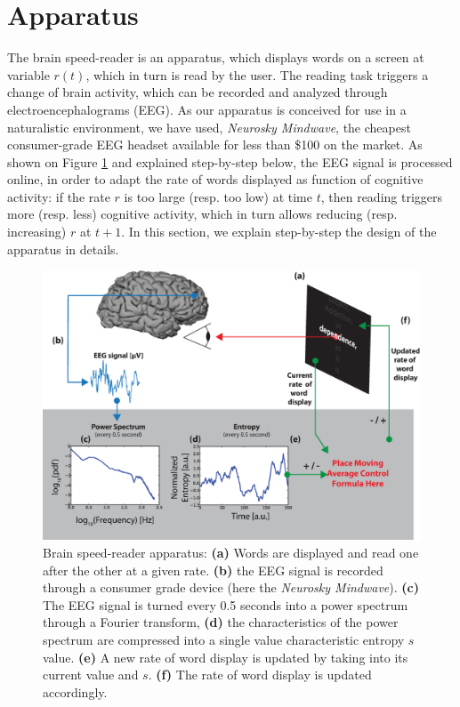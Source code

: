 \section{Apparatus}
The brain speed-reader is an apparatus, which displays words on a screen at variable $r(t)$, which in turn is read by the user. The reading task triggers a change of brain activity, which can be recorded and analyzed through electroencephalograms (EEG). As our apparatus is conceived for use in a naturalistic environment, we have used, {\it Neurosky Mindwave}, the cheapest consumer-grade EEG headset available for less than \$100 on the market. As shown on Figure \ref{fig:apparatus} and explained step-by-step below, the EEG signal is processed online, in order to adapt the rate of words displayed as function of cognitive activity: if the rate $r$ is too large (resp. too low) at time $t$, then reading triggers more  (resp. less) cognitive activity, which in turn allows reducing (resp. increasing) $r$ at $t+1$. In this section, we explain step-by-step the design of the apparatus in details.

\begin{figure}[!t]
\centering
\includegraphics[width=0.9\columnwidth]{../figures/apparatus.eps}
\caption{Brain speed-reader apparatus: {\bf (a)} Words are displayed and read one after the other at a given rate. {\bf (b)} the EEG signal is recorded through a consumer grade device (here the {\it Neurosky Mindwave}). {\bf (c)} The EEG signal is turned every 0.5 seconds into a power spectrum through a Fourier transform, {\bf (d)} the characteristics of the power spectrum are compressed into a single value characteristic entropy $s$ value. {\bf (e)} A new rate of word display is updated by taking into its current value and $s$. {\bf (f)} The rate of word display is updated accordingly.}
\label{fig:apparatus}
\end{figure}

